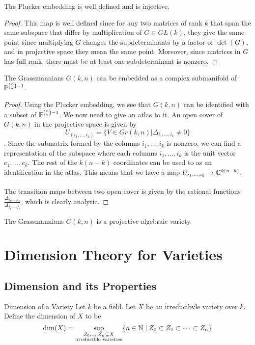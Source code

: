 \documentclass[a4paper]{article}
\begin{document}
\begin{prp}{}{} The Plucker embedding is well defined and is injective. \tcbline
\begin{proof}
This map is well defined since for any two matrices of rank $k$ that span the same subspace that differ by multiplication of $G\in GL(k)$, they give the same point since multiplying $G$ changes the subdeterminants by a factor of $\det(G)$, and in projective space they mean the same point. Moreover, since matrices in $G$ has full rank, there must be at least one subdeterminant is nonzero. 
\end{proof}
\end{prp}

\begin{thm}{}{} The Grassmannians $G(k,n)$ can be embedded as a complex submanifold of $\mathbb{P}^{\binom{n}{k}-1}$. \tcbline
\begin{proof}
Using the Plucker embedding, we see that $G(k,n)$ can be identified with a subset of $\mathbb{P}^{\binom{n}{k}-1}$. We now need to give an atlas to it. An open cover of $G(k,n)$ in the projective space is given by $$U_{(i_1,\dots,i_k)}=\{V\in Gr(k,n)|\Delta_{i_1,\dots,i_k}\neq 0\}$$. Since the submatrix formed by the columns $i_1,\dots,i_k$ is nonzero, we can find a representation of the subspace where each columns $i_1,\dots,i_k$ is the unit vector $e_1,\dots,e_k$. The rest of the $k(n-k)$ coordinates can be used to as an identification in the atlas. This means that we have a map $U_{i_1,\dots,i_k}\to\mathbb{C}^{k(n-k)}$. \\~\\
The transition maps between two open cover is given by the rational functions $\frac{\Delta_{i_1,\dots,i_k}}{\Delta_{j_1,\dots,j_k}}$, which is clearly analytic. 
\end{proof}
\end{thm}

\begin{thm}{}{} The Grassmannians $G(k,n)$ is a projective algebraic variety. 
\end{thm}

\pagebreak
\section{Dimension Theory for Varieties}
\subsection{Dimension and its Properties}
\begin{defn}{Dimension of a Variety}{} Let $k$ be a field. Let $X$ be an irreducibvle variety over $k$. Define the dimension of $X$ to be $$\dim(X)=\sup_{\substack{Z_0,\dots,Z_n\subseteq X\\\text{irreducible varieties}}}\{n\in\mathbb{N}\;|\;Z_0\subset Z_1\subset\dots\subset Z_n\}$$
\end{defn}
\end{document}
